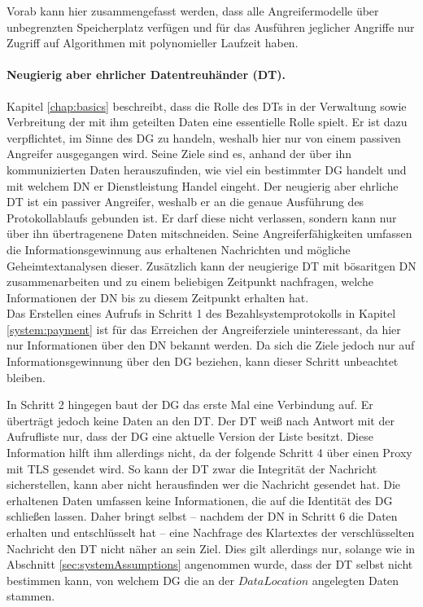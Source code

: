 \documentclass[
	fontsize=11pt,
	headings=small,
	parskip=half,           %
	bibliography=totoc,
	numbers=noenddot,       %
	open=any,               %
]{scrreprt}
\begin{document}
Vorab kann hier zusammengefasst werden, dass alle Angreifermodelle über unbegrenzten Speicherplatz verfügen und für das Ausführen jeglicher Angriffe nur Zugriff auf Algorithmen mit polynomieller Laufzeit haben.


\paragraph{Neugierig aber ehrlicher Datentreuhänder (DT).}
Kapitel \ref{chap:basics} beschreibt, dass die Rolle des DTs in der Verwaltung sowie Verbreitung der mit ihm geteilten Daten eine essentielle Rolle spielt.  Er ist dazu verpflichtet, im Sinne des DG zu handeln, weshalb hier nur von einem passiven Angreifer ausgegangen wird. Seine Ziele sind es, anhand der über ihn kommunizierten Daten herauszufinden, wie viel ein bestimmter DG handelt und mit welchem DN er Dienstleistung Handel eingeht. Der neugierig aber ehrliche DT ist ein passiver Angreifer, weshalb er an die genaue Ausführung des Protokollablaufs gebunden ist. Er darf diese nicht verlassen, sondern kann nur über ihn übertragenene Daten mitschneiden. Seine Angreiferfähigkeiten umfassen die Informationsgewinnung aus erhaltenen Nachrichten und mögliche Geheimtextanalysen dieser. Zusätzlich kann der neugierige DT mit bösaritgen DN zusammenarbeiten und zu einem beliebigen Zeitpunkt nachfragen, welche Informationen der DN bis zu diesem Zeitpunkt erhalten hat.\\

Das Erstellen eines Aufrufs in Schritt 1 des Bezahlsystemprotokolls in Kapitel \ref{system:payment} ist für das Erreichen der Angreiferziele uninteressant, da hier nur Informationen über den DN bekannt werden. Da sich die Ziele jedoch nur auf Informationsgewinnung über den DG beziehen, kann dieser Schritt unbeachtet bleiben. 

In Schritt 2 hingegen baut der DG das erste Mal eine Verbindung auf. Er überträgt jedoch keine Daten an den DT. Der DT weiß nach Antwort mit der Aufrufliste nur, dass der DG eine aktuelle Version der Liste besitzt. Diese Information hilft ihm allerdings nicht, da der folgende Schritt 4 über einen Proxy mit TLS gesendet wird. So kann der DT zwar die Integrität der Nachricht sicherstellen, kann aber nicht herausfinden wer die Nachricht gesendet hat. Die erhaltenen Daten umfassen keine Informationen, die auf die Identität des DG schließen lassen. Daher bringt selbst -- nachdem der DN in Schritt 6 die Daten erhalten und entschlüsselt hat -- eine Nachfrage des Klartextes der verschlüsselten Nachricht den DT nicht näher an sein Ziel. Dies gilt allerdings nur, solange wie in Abschnitt \ref{sec:systemAssumptions} angenommen wurde, dass der DT selbst nicht bestimmen kann, von welchem DG die an der $DataLocation$ angelegten Daten stammen.
\end{document}
